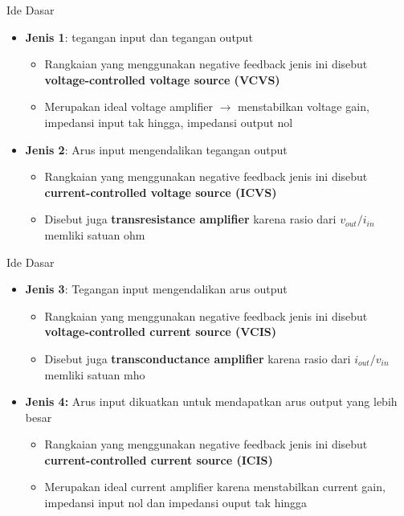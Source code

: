 \begin{frame}{Ide Dasar}
	\begin{itemize}
		\item \textbf{Jenis 1}: tegangan input dan tegangan output
		\begin{itemize}
			\item Rangkaian yang menggunakan negative feedback jenis ini disebut \textbf{voltage-controlled voltage source (VCVS)}
			\item Merupakan ideal voltage amplifier $ \rightarrow $ menstabilkan voltage gain, impedansi input tak hingga, impedansi output nol
		\end{itemize}
	
		\item \textbf{Jenis 2}: Arus input mengendalikan tegangan output
		\begin{itemize}
			\item Rangkaian yang menggunakan negative feedback jenis ini disebut \textbf{current-controlled voltage source (ICVS)}
			\item Disebut juga \textbf{transresistance amplifier} karena rasio dari $ v_{out}/i_{in} $ memliki satuan ohm
		\end{itemize}
	\end{itemize}
\end{frame}

\begin{frame}{Ide Dasar}
	\begin{itemize}	
		\item \textbf{Jenis 3}: Tegangan input mengendalikan arus output
		\begin{itemize}
			\item Rangkaian yang menggunakan negative feedback jenis ini disebut \textbf{voltage-controlled current source (VCIS)}
			\item Disebut juga \textbf{transconductance amplifier} karena rasio dari $ i_{out}/v_{in} $ memliki satuan mho
		\end{itemize}
		
		\item \textbf{Jenis 4:} Arus input dikuatkan untuk mendapatkan arus output yang lebih besar
		\begin{itemize}
			\item Rangkaian yang menggunakan negative feedback jenis ini disebut \textbf{current-controlled current source (ICIS)}
			\item Merupakan ideal current amplifier karena menstabilkan current gain, impedansi input nol dan impedansi ouput tak hingga
		\end{itemize}
	\end{itemize}
\end{frame}

